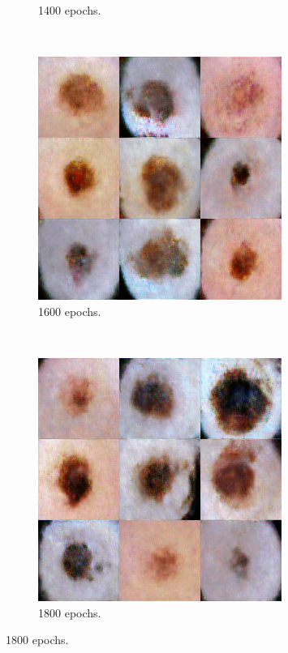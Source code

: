 \documentclass[conference]{IEEEtran}
\begin{document}
\begin{figure}
\begin{subfigure}[b]{0.15\textwidth}
        \caption{1400 epochs.}
        \label{fig:7}
    \end{subfigure}
   ~
    \begin{subfigure}[b]{0.15\textwidth}
        \includegraphics[width=\textwidth]{11.png}
        \caption{1600 epochs.}
        \label{fig:8}
    \end{subfigure}
  ~
    \begin{subfigure}[b]{0.15\textwidth}
        \includegraphics[width=\textwidth]{12.png}
        \caption{1800 epochs.}
        \label{fig:8}
    \end{subfigure} 
       

\end{figure}
\end{document}
